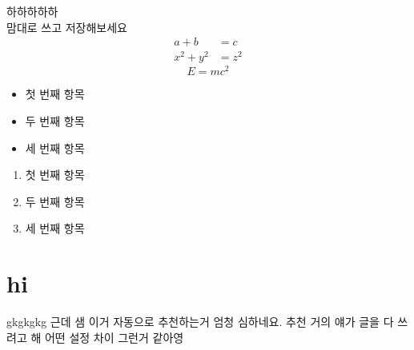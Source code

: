 \documentclass{article}
\begin{document}
하하하하하 \\
맘대로 쓰고 저장해보세요
\begin{align*} 
    a + b &= c \\ 
    x^2 + y^2 &= z^2
\end{align*}
\begin{equation} 
    E = mc^2
\end{equation}
\begin{itemize}
    \item 첫 번째 항목
    \item 두 번째 항목
    \item 세 번째 항목
\end{itemize}
\begin{enumerate}
    \item 첫 번째 항목
    \item 두 번째 항목
    \item 세 번째 항목
\end{enumerate}
\section{hi}
gkgkgkg
근데 샘 이거 자동으로 추천하는거 엄청 심하네요. 추천
거의 얘가 글을 다 쓰려고 해 어떤 설정 차이 그런거 같아영
\end{document}
